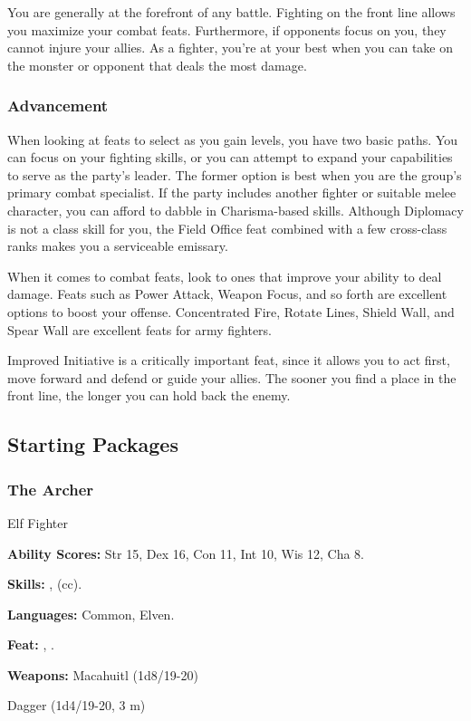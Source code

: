 You are generally at the forefront of any battle. Fighting on the front line allows you maximize your combat feats. Furthermore, if opponents focus on you, they cannot injure your allies. As a fighter, you're at your best when you can take on the monster or opponent that deals the most damage.

\subsubsection{Advancement}
When looking at feats to select as you gain levels, you have two basic paths. You can focus on your fighting skills, or you can attempt to expand your capabilities to serve as the party's leader. The former option is best when you are the group's primary combat specialist. If the party includes another fighter or suitable melee character, you can afford to dabble in Charisma-based skills. Although Diplomacy is not a class skill for you, the Field Office feat combined with a few cross-class ranks makes you a serviceable emissary.

When it comes to combat feats, look to ones that improve your ability to deal damage. Feats such as Power Attack, Weapon Focus, and so forth are excellent options to boost your offense. Concentrated Fire, Rotate Lines, Shield Wall, and Spear Wall are excellent feats for army fighters.

Improved Initiative is a critically important feat, since it allows you to act first, move forward and defend or guide your allies. The sooner you find a place in the front line, the longer you can hold back the enemy.


\subsection{Starting Packages}
\subsubsection{The Archer}
Elf Fighter

\textbf{Ability Scores:} Str 15, Dex 16, Con 11, Int 10, Wis 12, Cha 8.

\textbf{Skills:} ,  (cc).

\textbf{Languages:} Common, Elven.

\textbf{Feat:} , .

\textbf{Weapons:} Macahuitl (1d8/19-20)

Dagger (1d4/19-20, 3 m)

